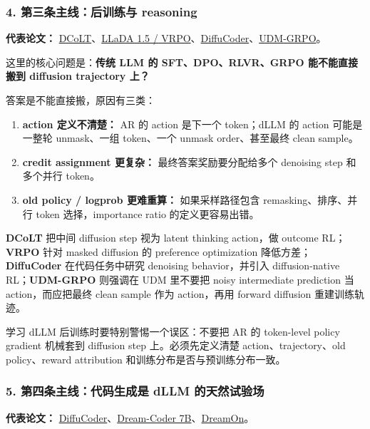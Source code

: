\subsubsection{4. 第三条主线：后训练与 reasoning}

\textbf{代表论文：} \href{https://arxiv.org/abs/2505.10446}{DCoLT}、\href{https://arxiv.org/abs/2505.19223}{LLaDA 1.5 / VRPO}、\href{https://arxiv.org/abs/2506.20639}{DiffuCoder}、\href{https://arxiv.org/abs/2604.18518}{UDM-GRPO}。

这里的核心问题是：\textbf{传统 LLM 的 SFT、DPO、RLVR、GRPO 能不能直接搬到 diffusion trajectory 上？}

答案是不能直接搬，原因有三类：

\begin{enumerate}[leftmargin=1.5em]
  \item \textbf{action 定义不清楚：} AR 的 action 是下一个 token；dLLM 的 action 可能是一整轮 unmask、一组 token、一个 unmask order、甚至最终 clean sample。
  \item \textbf{credit assignment 更复杂：} 最终答案奖励要分配给多个 denoising step 和多个并行 token。
  \item \textbf{old policy / logprob 更难重算：} 如果采样路径包含 remasking、排序、并行 token 选择，importance ratio 的定义更容易出错。
\end{enumerate}

\textbf{DCoLT} 把中间 diffusion step 视为 latent thinking action，做 outcome RL；\textbf{VRPO} 针对 masked diffusion 的 preference optimization 降低方差；\textbf{DiffuCoder} 在代码任务中研究 denoising behavior，并引入 diffusion-native RL；\textbf{UDM-GRPO} 则强调在 UDM 里不要把 noisy intermediate prediction 当 action，而应把最终 clean sample 作为 action，再用 forward diffusion 重建训练轨迹。

\begin{warnbox}
学习 dLLM 后训练时要特别警惕一个误区：不要把 AR 的 token-level policy gradient 机械套到 diffusion step 上。必须先定义清楚 action、trajectory、old policy、reward attribution 和训练分布是否与预训练分布一致。
\end{warnbox}

\subsubsection{5. 第四条主线：代码生成是 dLLM 的天然试验场}

\textbf{代表论文：} \href{https://arxiv.org/abs/2506.20639}{DiffuCoder}、\href{https://arxiv.org/abs/2509.01142}{Dream-Coder 7B}、\href{https://arxiv.org/abs/2602.01326}{DreamOn}。

